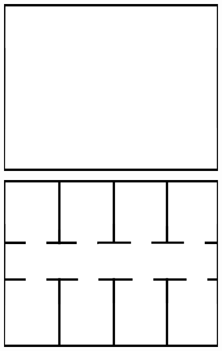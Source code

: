 \documentclass[letterpaper, 10 pt, conference]{ieeeconf}  %
\begin{document}
\begin{figure}[H]
	\centering
	\begin{minipage}{0.3\columnwidth}
		\centering
		\includegraphics[width=\columnwidth]{free-space.png}
		\label{fig:free}
	\end{minipage}
	\begin{minipage}{0.3\columnwidth}
		\centering
		\includegraphics[width=\columnwidth]{office.png}
		\label{fig:office}
	\end{minipage}
	\begin{minipage}{0.3\columnwidth}
		\centering

\end{minipage}
\end{figure}
\end{document}
